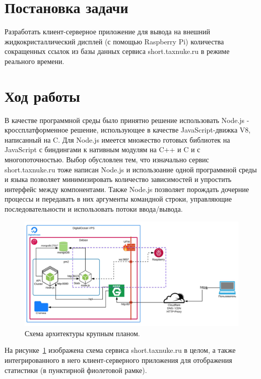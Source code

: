 \documentclass[a4paper, 12pt]{article}
\begin{document}
    

    \newpage

    \section*{Постановка задачи}
        Разработать клиент-серверное приложение для вывода на внешний жидкокристаллический
        дисплей (с помощью Raspberry Pi) количества сокращенных ссылок из базы данных сервиса short.taxnuke.ru в режиме реального времени.

    \section*{Ход работы}
        В качестве программной среды было принятно решение использовать Node.js - кроссплатформенное решение,
        использующее в качестве JavaScript-движка V8, написанный на C. Для Node.js имеется множество готовых библиотек
        на JavaScript с биндингами к нативным модулям на C++ и C и с многопоточностью.
        Выбор обусловлен тем, что изначально сервис short.taxnuke.ru тоже написан Node.js и использоание
        одной программной среды и языка позволяет минимизировать количество зависимостей и упростить интерфейс между компонентами.
        Также Node.js позволяет порождать дочерние процессы и передавать в них аргументы командной
        строки, управляющие последовательности и использовать потоки ввода/вывода.

        \begin{figure}
            \includegraphics[width=\linewidth]{img/arch.jpg}
            \caption{Схема архитектуры крупным планом.}
            \label{fig:big_arch}
        \end{figure}

        На рисунке~\ref{fig:big_arch} изображена схема сервиса short.taxnuke.ru в целом, а также интегрированного в него
        клиент-серверного приложения для отображения статистики (в пунктирной фиолетовой рамке).
\end{document}
